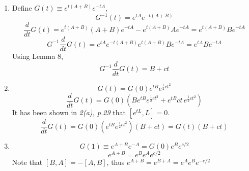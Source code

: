 \begin{sol}
\begin{enumerate}[label=\textbf{(\alph*)}]
\item
Define $G(t)\equiv e^{t(A+B)}e^{-tA}$,
$$G^{-1}(t)=e^{tA}e^{-t(A+B)}$$
$$\frac{d}{dt}G(t)=e^{t(A+B)}(A+B)e^{-tA}-e^{t(A+B)}Ae^{-tA}=e^{t(A+B)}Be^{-tA}$$
$$G^{-1}\frac{d}{dt}G(t)=e^{tA}e^{-t(A+B)}e^{t(A+B)}Be^{-tA}=e^{tA}Be^{-tA}$$
Using Lemma 8, 
$$G^{-1}\frac{d}{dt}G(t)=B+ct$$ 
\item
$$G(t)=G(0)e^{tB}e^{\frac{1}{2}ct^2}$$
$$\frac{d}{dt}G(t)=G(0)(Be^{tB}e^{\frac{1}{2}ct^2}+e^{tB}ct\,e^{\frac{1}{2}ct^2})$$
It has been shown in \textit{2(a), p.29} that $[e^{tL},L]=0$. 
$$\frac{d}{dt}G(t)=G(0)(e^{tB}e^{\frac{1}{2}ct^2})(B+ct)=G(t)(B+ct)$$
\item
$$G(1)\equiv e^{A+B}e^{-A}=G(0)e^Be^{c/2}$$
$$e^{A+B}=e^Be^Ae^{c/2}$$ 
Note that $[B,A]=-[A,B]$, thus $e^{A+B}=e^{B+A}=e^Ae^Be^{-c/2}$
\end{enumerate}
\end{sol}